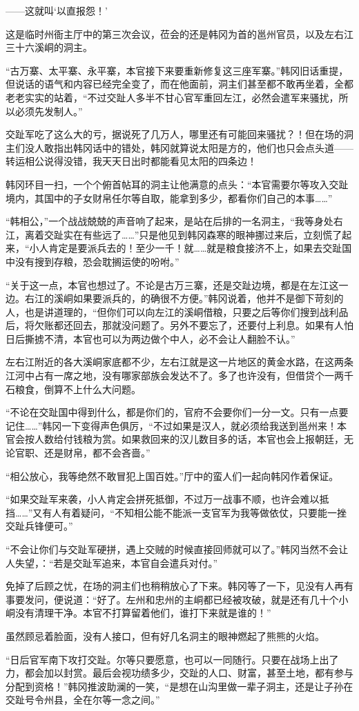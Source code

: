 ——这就叫‘以直报怨！’

这是临时州衙主厅中的第三次会议，莅会的还是韩冈为首的邕州官员，以及左右江三十六溪峒的洞主。

“古万寨、太平寨、永平寨，本官接下来要重新修复这三座军寨。”韩冈旧话重提，但说话的语气和内容已经完全变了，而在他面前，洞主们甚至都不敢再坐着，全都老老实实的站着，“不过交趾人多半不甘心官军重回左江，必然会遣军来骚扰，所以必须先发制人。”

交趾军吃了这么大的亏，据说死了几万人，哪里还有可能回来骚扰？！但在场的洞主们没人敢指出韩冈话中的错处，韩冈就算说太阳是方的，他们也只会点头道——转运相公说得没错，我天天日出时都能看见太阳的四条边！

韩冈环目一扫，一个个俯首帖耳的洞主让他满意的点头：“本官需要尔等攻入交趾境内，其国中的子女财帛任尔等自取，能拿到多少，都看你们自己的本事……”

“韩相公，”一个战战兢兢的声音响了起来，是站在后排的一名洞主，“我等身处右江，离着交趾实在有些远了……”只是他见到韩冈森寒的眼神挪过来后，立刻慌了起来，“小人肯定是要派兵去的！至少一千！就……就是粮食接济不上，如果去交趾国中没有搜到存粮，恐会耽搁运使的吩咐。”

“关于这一点，本官也想过了。不论是古万三寨，还是交趾边境，都是在左江这一边。右江的溪峒如果要派兵的，的确很不方便。”韩冈说着，他并不是御下苛刻的人，也是讲道理的，“但你们可以向左江的溪峒借粮，只要之后等你们搜到战利品后，将欠账都还回去，那就没问题了。另外不要忘了，还要付上利息。如果有人怕日后撕掳不清，本官也可以为两边做个中人，必不会让人翻脸不认。”

左右江附近的各大溪峒家底都不少，左右江就是这一片地区的黄金水路，在这两条江河中占有一席之地，没有哪家部族会发达不了。多了也许没有，但借贷个一两千石粮食，倒算不上什么大问题。

“不论在交趾国中得到什么，都是你们的，官府不会要你们一分一文。只有一点要记住……”韩冈一下变得声色俱厉，“不过如果是汉人，就必须给我送到邕州来！本官会按人数给付钱粮为赏。如果救回来的汉儿数目多的话，本官也会上报朝廷，无论官职、还是财帛，都不会吝啬。”

“相公放心，我等绝然不敢冒犯上国百姓。”厅中的蛮人们一起向韩冈作着保证。

“如果交趾军来袭，小人肯定会拼死抵御，不过万一战事不顺，也许会难以抵挡……”又有人有着疑问，“不知相公能不能派一支官军为我等做依仗，只要能一挫交趾兵锋便可。”

“不会让你们与交趾军硬拼，遇上交贼的时候直接回师就可以了。”韩冈当然不会让人失望，：“若是交趾军追来，本官自会遣兵对付。”

免掉了后顾之忧，在场的洞主们也稍稍放心了下来。韩冈等了一下，见没有人再有事要发问，便说道：“好了。左州和忠州的主峒都已经被攻破，就是还有几十个小峒没有清理干净。本官不打算留着他们，谁打下来就是谁的！”

虽然顾忌着脸面，没有人接口，但有好几名洞主的眼神燃起了熊熊的火焰。

“日后官军南下攻打交趾。尔等只要愿意，也可以一同随行。只要在战场上出了力，都会加以封赏。最后会视功绩多少，交趾的人口、财富，甚至土地，都有参与分配到资格！”韩冈推波助澜的一笑，“是想在山沟里做一辈子洞主，还是让子孙在交趾号令州县，全在尔等一念之间。”

